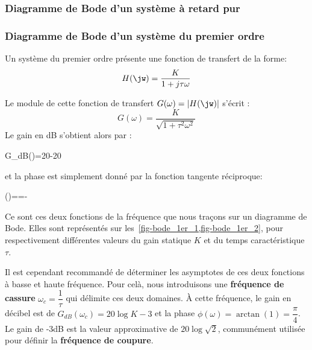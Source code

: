 \subsubsection{Diagramme de Bode d'un système à retard pur}


\subsubsection{Diagramme de Bode d'un système du premier ordre}

Un système du premier ordre présente une fonction de transfert de la forme:
\begin{align}
H(\jw)=\dfrac{K}{1+j\tau\omega }\label{eq-1er_ftjw}
\end{align}

Le module de cette fonction de transfert $G(\omega) =|H(\jw)|$ s'écrit :
$$G(\omega)=\dfrac{K}{\sqrt{1+\tau^2\omega^2}}$$
Le gain en dB s'obtient alors par :
\begin{bequation}
    G_{dB}(\omega)=20-20\label{eq-gain_1er}
\end{bequation}
et la phase est simplement donné par la fonction tangente réciproque:
\begin{bequation}
    \phi(\omega)==-\arctan{(\tau\omega)}\label{eq-phase_1er} 
\end{bequation}
Ce sont ces deux fonctions de la fréquence que nous traçons sur un diagramme de Bode.
Elles sont représentés sur les~\cref{fig-bode_1er_1,fig-bode_1er_2}, pour respectivement différentes valeurs 
du gain statique $K$ et du temps caractéristique $\tau$.
\newline

Il est cependant recommandé de déterminer les asymptotes 
de ces deux fonctions à basse et haute fréquence. 
Pour celà, nous introduisons une \textbf{fréquence de cassure} $\omega_c=\dfrac{1}{\tau}$ 
qui délimite ces deux domaines.
\`A cette fréquence, le gain en décibel est de $G_{dB}(\omega_c)=20\log{K}-3$ et la phase 
$\phi(\omega)=\arctan{(1)}=\dfrac{\pi}{4}$. 
Le gain de -3dB est la valeur approximative de $20\log{\sqrt{2}}$, communément utilisée pour définir la 
\textbf{fréquence de coupure}.


